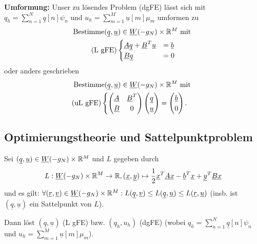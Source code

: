 \textbf{Umformung:} Unser zu lösendes Problem (dgFE) lässt sich mit $ q_h = \sum_{n=1}^{N} \underline{q}[n] \psi_n $ und $ u_h = \sum_{m=1}^{M} \underline{u}[m] \mu_m $ umformen zu 
\begin{gather*}
	\text{Bestimme} (\underline{q},\underline{u}) \in \underline{W}(-g_N)\times \mathbb{R}^M \text{ mit }\\
	\text{(L gFE)}\begin{cases}
		\underline{A} \underline{q} + \underline{B}^T \underline{u} &= \underline{b} \\
		\underline{B} \underline{q} &= 0
	\end{cases}
\end{gather*}
oder anders geschrieben 
\begin{gather*}
\text{Bestimme} (\underline{q},\underline{u}) \in \underline{W}(-g_N)\times \mathbb{R}^M \text{ mit }\\
	\text{(uL gFE)}\begin{cases}
		\begin{pmatrix}
			\underline{A} &\underline{B}^T\\
			\underline{B} &0
		\end{pmatrix}
		\begin{pmatrix}
			 \underline{q} \\
			 \underline{u} 
		\end{pmatrix}
		 =
		 \begin{pmatrix}
			 \underline{b}\\
			 0
		 \end{pmatrix}.
	\end{cases}
\end{gather*}

\subsection{Optimierungstheorie und Sattelpunktproblem}
\begin{Lemma}\label{Sattelpunkt} Sei $ (\underline{q},\underline{u}) \in \underline{W}(-g_N) \times \mathbb{R}^M $ und $ L $ gegeben durch 
\[L: \underline{W}(-g_N) \times \mathbb{R}^M \to \mathbb{R}, (\underline{x}, \underline{y}) \mapsto \frac{1}{2} \underline{x}^T \underline{A} \underline{x} - \underline{b}^T \underline{x} + \underline{y}^T \underline{B} \underline{x} \]
und es gilt: $ \forall (\underline{r}, \underline{v}) \in \underline{W}(-g_N) \times \mathbb{R}^M: L(\underline{q}, \underline{v}) \leq L(\underline{q}, \underline{u}) \leq L(\underline{r}, \underline{u}) $ (insb. ist $ (\underline{q},\underline{u}) $ ein Sattelpunkt von $ L $).

Dann löst $ (\underline{q}, \underline{u}) $ (L gFE) bzw. $ (q_h,u_h) $ (dgFE) (wobei $ q_h = \sum_{n=1}^N \underline{q}[n] \psi_n $ und $ u_h = \sum_{m=1}^M\underline{u}[m] \mu_m $).
\end{Lemma}

